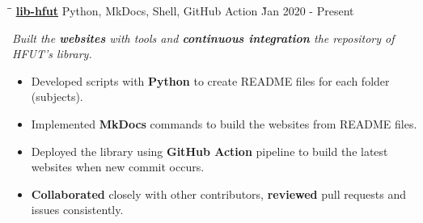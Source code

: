 \documentclass{res}
\begin{document}
\begin{resume}
    \vspace{-0.2in}	 
    \begin{tabbing}
    \hspace{2.391in}\= \hspace{3in}\= \kill %
    \href{https://github.com/lib-hfut/lib-hfut}{\bf lib-hfut}  \> 
                Python, MkDocs, Shell, GitHub Action \` Jan 2020 - Present \\
    \end{tabbing}\vspace{-20pt}      %
    \vspace{-0.13in}
    \textit{Built the {\bf websites} with tools and {\bf continuous integration} the repository of 
            HFUT's library.}
    \vspace{+0.05in}
    \begin{itemize} \itemsep 0.5pt %
        \item Developed scripts with {\bf Python} to create README files for each folder (subjects). 
        \item Implemented {\bf MkDocs} commands to build the websites from README files.
        \item Deployed the library using {\bf GitHub Action} pipeline to build the latest websites 
                when new commit occurs.
        \item {\bf Collaborated} closely with other contributors, {\bf reviewed} 
                pull requests and issues consistently.
    \end{itemize}

\end{resume}
\end{document}
